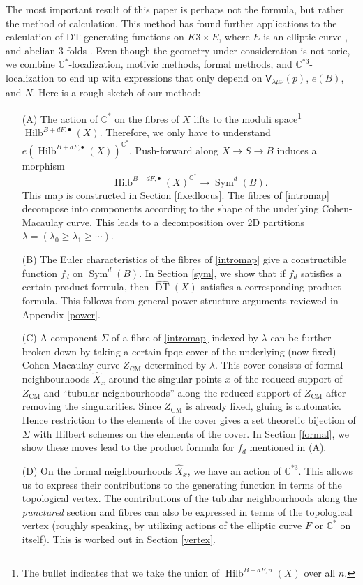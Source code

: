 \documentclass{amsart}
\theoremstyle{definition}
\newcommand{\CC} {\mathbb{C}}          %
\newcommand{\sfV}{\mathsf{V}}
\newcommand{\Sym}{\operatorname{Sym}}
\newcommand{\Hilb}{\operatorname{Hilb}}
\newcommand{\DT}{\operatorname{DT}}
\newcommand{\CM}{\operatorname{CM}}
\begin{document}
The most important result of this paper is perhaps not the formula, but rather the method of calculation. This method has found further applications to the calculation of DT generating functions on $K3 \times E$, where $E$ is an elliptic curve \cite{Bry}, and abelian 3-folds \cite{BOPY}. Even though the geometry under consideration is not toric, we combine $\CC^*$-localization, motivic methods, formal methods, and $\CC^{*3}$-localization to end up with expressions that only depend on $\sfV_{\lambda\mu\nu}(p)$, $e(B)$, and $N$. Here is a rough sketch of our method:
\begin{enumerate}
\item[(A)] The action of $\CC^*$ on the fibres of $X$ lifts to the moduli space\footnote{The bullet indicates that we take the union of $\Hilb^{B+dF,n}(X)$ over all $n$.} $\Hilb^{B+dF,\bullet}(X)$. Therefore, we only have to understand $e(\Hilb^{B+dF,\bullet}(X))^{\CC^*}$. Push-forward along $X \rightarrow S \rightarrow B$ induces a morphism
\begin{equation} \label{intromap}
\Hilb^{B+dF,\bullet}(X)^{\CC^*} \rightarrow \Sym^d(B).
\end{equation}
This map is constructed in Section \ref{fixedlocus}. The fibres of \eqref{intromap} decompose into components according to the shape of the underlying Cohen-Macaulay curve. This leads to a decomposition over 2D partitions $\lambda = (\lambda_0 \geq \lambda_1 \geq \cdots)$.
\item[(B)] The Euler characteristics of the fibres of \eqref{intromap} give a constructible function $f_d$ on $\Sym^d(B)$. In Section \ref{sym}, we show that if $f_d$ satisfies a certain product formula, then $\widehat{\DT}(X)$ satisfies a corresponding product formula. This follows from general power structure arguments reviewed in Appendix \ref{power}.
\item[(C)] A component $\Sigma$ of a fibre of \eqref{intromap} indexed by $\lambda$ can be further broken down by taking a certain fpqc cover of the underlying (now fixed) Cohen-Macaulay curve $Z_{\CM}$ determined by $\lambda$. This cover consists of formal neighbourhoods $\widehat{X}_x$ around the singular points $x$ of the reduced support of $Z_{\CM}$ and ``tubular neighbourhoods'' along the reduced support of $Z_{\CM}$ after removing the singularities. Since $Z_{\CM}$ is already fixed, gluing is automatic. Hence restriction to the elements of the cover gives a set theoretic bijection of $\Sigma$ with Hilbert schemes on the elements of the cover. In Section \ref{formal}, we show these moves lead to the product formula for $f_d$ mentioned in (A).
\item[(D)] On the formal neighbourhoods $\widehat{X}_x$, we have an action of $\CC^{*3}$. This allows us to express their contributions to the generating function in terms of the topological vertex. The contributions of the tubular neighbourhoods along the \emph{punctured} section and fibres can also be expressed in terms of the topological vertex (roughly speaking, by utilizing actions of the elliptic curve $F$ or $\CC^*$ on itself). This is worked out in Section \ref{vertex}.
\end{enumerate}
\end{document}
